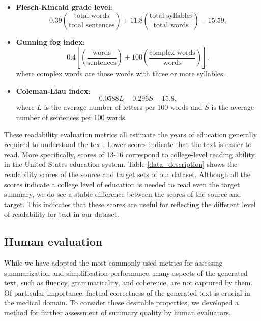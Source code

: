 \documentclass[letterpaper, table]{article} %
\begin{document}
\begin{itemize}
    \item \textbf{Flesch-Kincaid grade level}:
    $$0.39 \left (\frac{\mbox{total words}}{\mbox{total sentences}}\right ) + 11.8 \left (\frac{\mbox{total syllables}}{\mbox{total words}} \right ) - 15.59,$$
    \item \textbf{Gunning fog index}:
    $$0.4\left[\left(\frac{\mbox{words}}{\mbox{sentences}}\right ) +100\left (\frac{\mbox{complex words}}{\mbox{words}}\right)\right],$$
    where complex words are those words with three or more syllables. 
    \item \textbf{Coleman-Liau index}:
    $$0.0588L - 0.296S - 15.8,$$
    where $L$ is the average number of letters per 100 words and $S$ is the average number of sentences per 100 words. 
\end{itemize} 
    These readability evaluation metrics all estimate the years of education generally required to understand the text. Lower scores indicate that the text is easier to read.
    More specifically, scores of 13-16 correspond to college-level reading ability in the United States education system. Table \ref{data_description} shows the readability scores of the source and target sets of our dataset. Although all the scores indicate a college level of education is needed to read even the target summary, we do see a stable difference between the scores of the source and target. This indicates that these scores are useful for reflecting the different level of readability for text in our dataset.
\subsection{Human evaluation}
While we have adopted the most commonly used metrics for assessing summarization and simplification performance, many aspects of the generated text, such as fluency, grammaticality, and coherence, are not captured by them. Of particular importance, factual correctness of the generated text is crucial in the medical domain. To consider these desirable properties, we developed a method for further assessment of summary quality by human evaluators.
\end{document}
